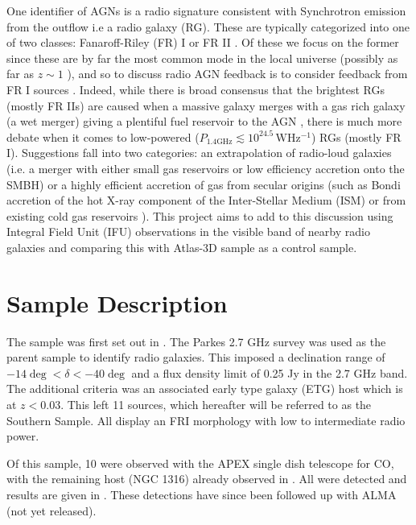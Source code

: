 \documentclass[fleqn,usenatbib,useAMS]{mnras}
\begin{document}
	One identifier of AGNs is a radio signature consistent with Synchrotron emission from the outflow i.e a radio galaxy (RG). These are typically categorized into one of two classes: Fanaroff-Riley (FR) I or FR II \citep{Fanaroff1974}. Of these we focus on the former since these are by far the most common mode in the local universe (possibly as far as $z \sim 1$ \citep{Rigby2008}), and so to discuss radio AGN feedback is to consider feedback from FR I sources \citep{DeYoung2010}. Indeed, while there is broad consensus \citep{Heckman1986, Baum1992} that the brightest RGs (mostly FR IIs) are caused when a massive galaxy merges with a gas rich galaxy (a wet merger) giving a plentiful fuel reservoir to the AGN \citep{Baum1992}, there is much more debate when it comes to low-powered ($P_\mathrm{1.4 GHz} \lesssim 10^{24.5} \, \mathrm{W Hz^{-1}}$) RGs (mostly FR I). Suggestions fall into two categories: an extrapolation of radio-loud galaxies (i.e. a merger with either small gas reservoirs or low efficiency accretion onto the SMBH) or a highly efficient accretion of gas from secular origins (such as Bondi accretion of the hot X-ray component of the Inter-Stellar Medium (ISM) \citep{Allen2006} or from existing cold gas reservoirs \citep{Prandoni2010}). This project aims to add to this discussion using Integral Field Unit (IFU) observations in the visible band of nearby radio galaxies and comparing this with Atlas-3D sample \citep{Cappellari2011} as a control sample.


\section{Sample Description}
	\label{sec:samp}
	The sample was first set out in \citet{Prandoni2010}. The Parkes 2.7 GHz survey was used as the parent sample to identify radio galaxies. This imposed a declination range of $-14\deg < \delta < -40\deg$ and a flux density limit of 0.25 Jy in the 2.7 GHz band. The additional criteria was an associated early type galaxy (ETG) host which is at $z<0.03$. This left 11 sources, which hereafter will be referred to as the Southern Sample. All display an FRI morphology with low to intermediate radio power.

	Of this sample, 10 were observed with the APEX single dish telescope for CO, with the remaining host (NGC 1316) already observed in \citet{Horellou2001}. All were detected and results are given in \citet{Prandoni2010}. These detections have since been followed up with ALMA (not yet released). 
\end{document}
